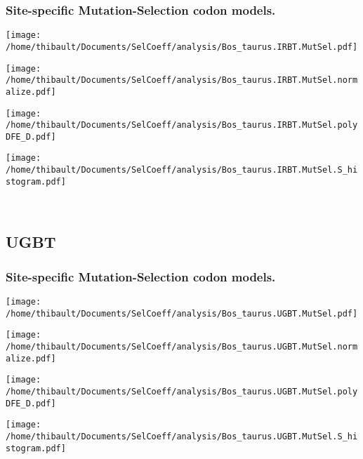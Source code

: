 \subsubsection*{Site-specific Mutation-Selection codon models.} 
\begin{minipage}{0.49\linewidth} 
\texttt{[image: /home/thibault/Documents/SelCoeff/analysis/Bos\_taurus.IRBT.MutSel.pdf]} 
\end{minipage}
\begin{minipage}{0.49\linewidth} 
\texttt{[image: /home/thibault/Documents/SelCoeff/analysis/Bos\_taurus.IRBT.MutSel.normalize.pdf]} 
\end{minipage}
\begin{minipage}{0.49\linewidth} 
\texttt{[image: /home/thibault/Documents/SelCoeff/analysis/Bos\_taurus.IRBT.MutSel.polyDFE\_D.pdf]} 
\end{minipage}
\begin{minipage}{0.49\linewidth} 
\texttt{[image: /home/thibault/Documents/SelCoeff/analysis/Bos\_taurus.IRBT.MutSel.S\_histogram.pdf]} 
\end{minipage}
\\ 
\subsection{UGBT} 
 
\subsubsection*{Site-specific Mutation-Selection codon models.} 
\begin{minipage}{0.49\linewidth} 
\texttt{[image: /home/thibault/Documents/SelCoeff/analysis/Bos\_taurus.UGBT.MutSel.pdf]} 
\end{minipage}
\begin{minipage}{0.49\linewidth} 
\texttt{[image: /home/thibault/Documents/SelCoeff/analysis/Bos\_taurus.UGBT.MutSel.normalize.pdf]} 
\end{minipage}
\begin{minipage}{0.49\linewidth} 
\texttt{[image: /home/thibault/Documents/SelCoeff/analysis/Bos\_taurus.UGBT.MutSel.polyDFE\_D.pdf]} 
\end{minipage}
\begin{minipage}{0.49\linewidth} 
\texttt{[image: /home/thibault/Documents/SelCoeff/analysis/Bos\_taurus.UGBT.MutSel.S\_histogram.pdf]} 
\end{minipage}
\\ 
